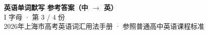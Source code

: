 \documentclass[10pt,a4paper]{article}
\begin{document}
\pagestyle{plain}

\begin{center}
{\LARGE\bfseries 英语单词默写 \quad 参考答案（中 $\to$ 英）}\\[0.22em]
{\large I 字母 · 第 3 / 4 份}\\[0.18em]
{\small 2026年上海市高考英语词汇用法手册 · 参照普通高中英语课程标准}
\end{center}

\vspace{0.2em}
\noindent{\color{rulegray}\rule{\textwidth}{0.8pt}}

\vspace{0.35em}

\vspace{0.25em}
\renewcommand{\arraystretch}{1.32}
\end{document}

